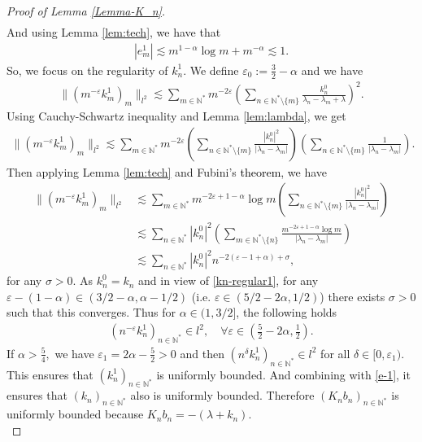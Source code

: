 \documentclass[11pt, dvipsnames]{amsart}
\begin{document}
{\begin{proof}[Proof of Lemma \ref{Lemma-K_n}]
\begin{align*}
\end{align*}
And using Lemma \ref{lem:tech}, we have that
\begin{align}
    |e_m^1|\lesssim m^{1-\alpha}\log m+m^{-\alpha}\lesssim 1.\label{e-1}
\end{align} So, we focus on the regularity of $k_n^1.$ We define $\varepsilon_0:=\frac{3}{2}-\alpha$ and we have
\begin{align*}
    \|(m^{-\varepsilon} k_m^1)_m\|_{l^2}\lesssim \sum_{m\in \mathbb{N}^*}m^{-2\varepsilon}\left(\sum_{n\in \mathbb{N}^*\setminus\{m\}}\frac{k_n^0}{\lambda_n-\lambda_m+\lambda}\right)^2.
\end{align*}
Using Cauchy-Schwartz inequality and Lemma \ref{lem:lambda}, we get
\begin{align*}
    \|(m^{-\varepsilon} k_m^1)_m\|_{l^2}\lesssim \sum_{m\in \mathbb{N}^*}m^{-2\varepsilon}\left(\sum_{n\in \mathbb{N}^*\setminus\{m\}}\frac{|k_n^0|^2}{|\lambda_n-\lambda_m|}\right)\left(\sum_{n\in \mathbb{N}^*\setminus\{m\}}\frac{1}{|\lambda_n-\lambda_m|}\right).
\end{align*}
Then applying Lemma \eqref{lem:tech} and Fubini's \textcolor{black}{theorem}, we have
\begin{align*}
    \|(m^{-\varepsilon} k_m^1)_m\|_{l^2}&\lesssim \sum_{m\in \mathbb{N}^*}m^{-2\varepsilon+1-\alpha}\log m\left(\sum_{n\in \mathbb{N}^*\setminus\{m\}}\frac{|k_n^0|^2}{|\lambda_n-\lambda_m|}\right)\\
    &\lesssim \sum_{n\in \mathbb{N}^*}|k_n^0|^2\left(\sum_{m\in \mathbb{N}^*\setminus\{n\}}\frac{m^{-2\varepsilon+1-\alpha}\log m}{|\lambda_n-\lambda_m|}\right)\\
    &\lesssim \sum_{n\in \mathbb{N}^*}|k_n^0|^2n^{-2(\varepsilon-1+\alpha)+\sigma},
\end{align*} 
for any $\sigma>0$. As $k_n^0=k_n$ and in view of \eqref{kn-regular1}, for any $\varepsilon-(1-\alpha)\in \left(3/2-\alpha,\alpha-1/2\right)$ (i.e. $\varepsilon\in \left(5/2-2\alpha,1/2\right)$) there exists $\sigma>0$ such that this converges. Thus for $\alpha\in (1,3/2]$, the following holds
\begin{align}
    (n^{-\varepsilon} k_n^1)_{n\in \mathbb{N}^*}\in l^2, \quad \forall \varepsilon\in \left(\frac{5}{2}-2\alpha,\frac{1}{2}\right).\label{kn1-l2}
\end{align}
If $\alpha>\frac{5}{4},$ we have $\varepsilon_1=2\alpha-\frac{5}{2}>0$ and then $(n^{\delta} k_n^1)_{n\in \mathbb{N}^*}\in l^2$ for all $\delta\in[0,\varepsilon_1).$ This ensures that $(k_n^1)_{n\in \mathbb{N}^*}$ is uniformly bounded. And combining with \eqref{e-1}, it ensures that $(k_n)_{n\in \mathbb{N}^*}$ also is uniformly bounded. Therefore $(K_n b_n)_{n\in \mathbb{N}^*}$ is uniformly bounded because $K_n b_n=-(\lambda+k_n).$ \\

\end{proof}}
\end{document}
